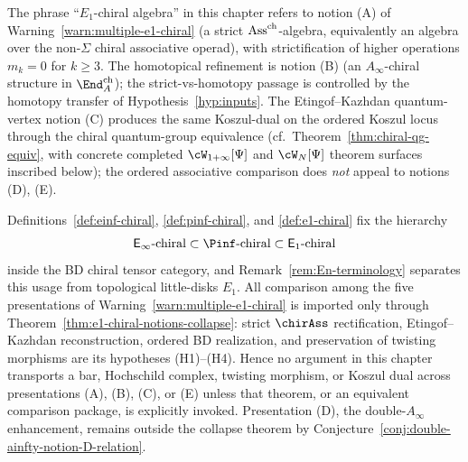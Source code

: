 \begin{remark}
\label{rem:ord-assoc-notion-fixed}
The phrase ``$E_1$-chiral algebra'' in this chapter refers to
notion \textup{(A)} of
Warning~\ref{warn:multiple-e1-chiral} (a strict
$\mathrm{Ass}^{\mathrm{ch}}$-algebra, equivalently an algebra over the non-$\Sigma$
chiral associative operad), with strictification of higher
operations $m_k = 0$ for $k\ge 3$. The homotopical refinement is
notion \textup{(B)} (an $A_\infty$-chiral structure in
$\End^{\mathrm{ch}}_A$); the strict-vs-homotopy passage is
controlled by the homotopy transfer of
Hypothesis~\ref{hyp:inputs}. The Etingof--Kazhdan
quantum-vertex notion \textup{(C)} produces the same Koszul-dual
on the ordered Koszul locus through the chiral quantum-group equivalence
\textup{(}cf.\ Theorem~\ref{thm:chiral-qg-equiv}, with concrete
completed $\cW_{1+\infty}[\Psi]$ and $\cW_N[\Psi]$ theorem surfaces
inscribed below\textup{)}; the ordered associative comparison does \emph{not}
appeal to notions \textup{(D)}, \textup{(E)}.
\end{remark}

\begin{remark}
\label{rem:ordered-presentation-comparison-firewall}
\ClaimStatusConditional{}
Definitions~\ref{def:einf-chiral}, \ref{def:pinf-chiral}, and
\ref{def:e1-chiral} fix the hierarchy
\[
\Einf\text{-chiral}\subset \Pinf\text{-chiral}\subset
\Eone\text{-chiral}
\]
inside the BD chiral tensor category, and
Remark~\ref{rem:En-terminology} separates this usage from
topological little-disks $E_1$.  All comparison among the five
presentations of Warning~\ref{warn:multiple-e1-chiral} is imported
only through Theorem~\ref{thm:e1-chiral-notions-collapse}: strict
$\chirAss$ rectification, Etingof--Kazhdan reconstruction, ordered
BD realization, and preservation of twisting morphisms are its
hypotheses \textup{(H1)--(H4)}.  Hence no argument in this chapter
transports a bar, Hochschild complex, twisting morphism, or Koszul
dual across presentations \textup{(A)}, \textup{(B)}, \textup{(C)},
or \textup{(E)} unless that theorem, or an equivalent comparison
package, is explicitly invoked.  Presentation \textup{(D)}, the
double-$A_\infty$ enhancement, remains outside the collapse theorem
by Conjecture~\ref{conj:double-ainfty-notion-D-relation}.
\end{remark}

